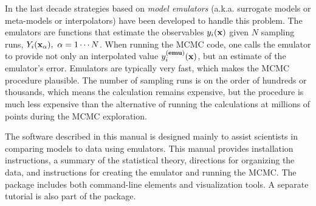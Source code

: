 In the last decade strategies based on {\it model emulators} (a.k.a. surrogate models or meta-models or interpolators) have been developed to handle this problem. The emulators are functions that estimate the observables $y_i({\bf x})$ given $N$ sampling runs, $Y_i({\bf x}_\alpha),~\alpha=1\cdots N$. When running the MCMC code, one calls the emulator to provide not only an interpolated value $y_i^{\bf(emu)}({\bf x})$, but an estimate of the emulator's error. Emulators are typically very fast, which makes the MCMC procedure plausible. The number of sampling runs is on the order of hundreds or thousands, which means the calculation remains expensive, but the procedure is much less expensive than the alternative of running the calculations at millions of points during the MCMC exploration.

The software described in this manual is designed mainly to assist scientists in comparing models to data using emulators. This manual provides installation instructions, a summary of the statistical theory, directions for organizing the data, and instructions for creating the emulator and running the MCMC. The package includes both command-line elements and visualization tools. A separate tutorial is also part of the package.